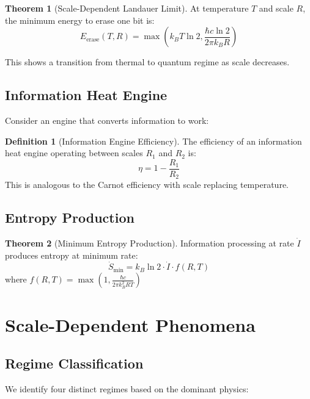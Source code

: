 \documentclass[11pt,a4paper]{article}
\theoremstyle{definition}
\newtheorem{definition}{Definition}[section]
\newtheorem{theorem}{Theorem}[section]
\begin{document}
\begin{theorem}[Scale-Dependent Landauer Limit]
At temperature $T$ and scale $R$, the minimum energy to erase one bit is:
\begin{equation}
E_{\text{erase}}(T,R) = \max\left(k_B T \ln 2, \frac{\hbar c \ln 2}{2\pi k_B R}\right)
\end{equation}
\end{theorem}

This shows a transition from thermal to quantum regime as scale decreases.

\subsection{Information Heat Engine}

Consider an engine that converts information to work:

\begin{definition}[Information Engine Efficiency]
The efficiency of an information heat engine operating between scales $R_1$ and $R_2$ is:
\begin{equation}
\eta = 1 - \frac{R_1}{R_2}
\end{equation}
This is analogous to the Carnot efficiency with scale replacing temperature.
\end{definition}

\subsection{Entropy Production}

\begin{theorem}[Minimum Entropy Production]
Information processing at rate $\dot{I}$ produces entropy at minimum rate:
\begin{equation}
\dot{S}_{\text{min}} = k_B \ln 2 \cdot \dot{I} \cdot f(R,T)
\end{equation}
where $f(R,T) = \max\left(1, \frac{\hbar c}{2\pi k_B^2 RT}\right)$
\end{theorem}

\section{Scale-Dependent Phenomena}

\subsection{Regime Classification}

We identify four distinct regimes based on the dominant physics:
\end{document}
